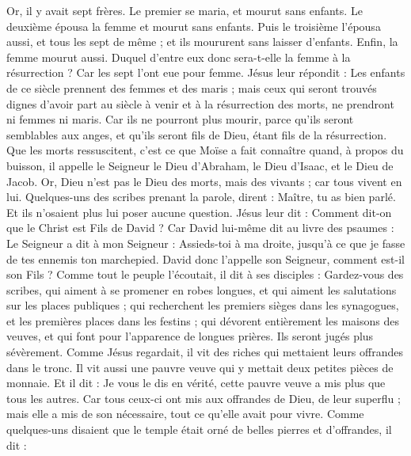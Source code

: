 \begin{multicols}{2}
{Or, il y avait sept frères. Le premier se maria, et mourut sans enfants.
Le deuxième épousa la femme et mourut sans enfants.
Puis le troisième l’épousa aussi, et tous les sept de même ; et ils moururent sans laisser d’enfants.
Enfin, la femme mourut aussi.
Duquel d’entre eux donc sera-t-elle la femme à la résurrection ? Car les sept l'ont eue pour femme.
Jésus leur répondit : Les enfants de ce siècle prennent des femmes et des maris ;
mais ceux qui seront trouvés dignes d’avoir part au siècle à venir et à la résurrection des morts, ne prendront ni femmes ni maris.
Car ils ne pourront plus mourir, parce qu'ils seront semblables aux anges, et qu'ils seront fils de Dieu, étant fils de la résurrection.
Que les morts ressuscitent, c’est ce que Moïse a fait connaître quand, à propos du buisson, il appelle le Seigneur le Dieu d'Abraham, le Dieu d'Isaac, et le Dieu de Jacob.
Or, Dieu n'est pas le Dieu des morts, mais des vivants ; car tous vivent en lui.
Quelques-uns des scribes prenant la parole, dirent : Maître, tu as bien parlé.
Et ils n’osaient plus lui poser aucune question.
Jésus leur dit : Comment dit-on que le Christ est Fils de David ?
Car David lui-même dit au livre des psaumes : Le Seigneur a dit à mon Seigneur : Assieds-toi à ma droite,
jusqu'à ce que je fasse de tes ennemis ton marchepied.
David donc l'appelle son Seigneur, comment est-il son Fils ?
Comme tout le peuple l’écoutait, il dit à ses disciples :
Gardez-vous des scribes, qui aiment à se promener en robes longues, et qui aiment les salutations sur les places publiques ; qui recherchent les premiers sièges dans les synagogues, et les premières places dans les festins ;
qui dévorent entièrement les maisons des veuves, et qui font pour l’apparence de longues prières. Ils seront jugés plus sévèrement.
\VerseOne{}Comme Jésus regardait, il vit des riches qui mettaient leurs offrandes dans le tronc.
Il vit aussi une pauvre veuve qui y mettait deux petites pièces de monnaie.
Et il dit : Je vous le dis en vérité, cette pauvre veuve a mis plus que tous les autres.
Car tous ceux-ci ont mis aux offrandes de Dieu, de leur superflu ; mais elle a mis de son nécessaire, tout ce qu'elle avait pour vivre.
Comme quelques-uns disaient que le temple était orné de belles pierres et d’offrandes, il dit :
}
\end{multicols}
